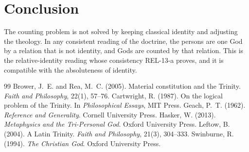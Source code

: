 \documentclass{situationist-preprint}
\begin{document}
\section{Conclusion}

The counting problem is not solved by keeping classical identity and adjusting the theology. In any consistent reading of the doctrine, the persons are one God by a relation that is not identity, and Gods are counted by that relation. This is the relative-identity reading whose consistency REL-13-a proves, and it is compatible with the absoluteness of identity.

\begin{thebibliography}{99}\small
{} Brower, J.~E. and Rea, M.~C. (2005). Material constitution and the Trinity. \emph{Faith and Philosophy}, 22(1), 57--76.
 Cartwright, R. (1987). On the logical problem of the Trinity. In \emph{Philosophical Essays}, MIT Press.
 Geach, P.~T. (1962). \emph{Reference and Generality}. Cornell University Press.
 Hasker, W. (2013). \emph{Metaphysics and the Tri-Personal God}. Oxford University Press.
 Leftow, B. (2004). A Latin Trinity. \emph{Faith and Philosophy}, 21(3), 304--333.
 Swinburne, R. (1994). \emph{The Christian God}. Oxford University Press.
\end{thebibliography}
\end{document}

